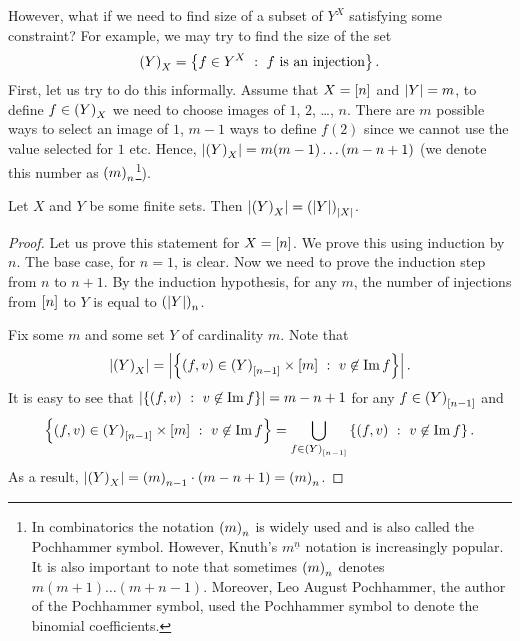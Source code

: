 However, what if we need to find size of a subset of $Y^X$ satisfying some
constraint? For example, we may try to find the size of the set
\[
  \injections{X}{Y} = \set[f\text{ is an injection}]{f \in \functions{X}{Y}}.
\]
First, let us try to do this informally. Assume that $X = \range{n}$ and
$\cardinality{Y} = m$,
to define $f \in \injections{X}{Y}$ we need to choose images of $1$, $2$, \dots,
$n$. There are $m$ possible ways to select an image of $1$, $m - 1$ ways to
define $f(2)$ since we cannot use the value selected for $1$ etc. Hence,
$\cardinality{\injections{X}{Y}} = m (m - 1) \dots (m - n + 1)$ (we denote this
number as $\numberOfPermutations[n]{m}$\footnote{%
  In combinatorics the notation $\numberOfPermutations[n]{m}$ is widely used and
  is also called the Pochhammer symbol. However, Knuth's $m^{\underline{n}}$
  notation is increasingly popular. It is also important to note that sometimes 
  $\numberOfPermutations[n]{m}$ denotes $m (m + 1) \dots (m + n - 1)$. Moreover,
  Leo August Pochhammer, the author of the Pochhammer symbol, used the
  Pochhammer symbol to denote the binomial coefficients.
}).

\begin{theorem}
\label{theorem:number-of-injections}
  Let $X$ and $Y$ be some finite sets. Then $\cardinality{\injections{X}{Y}} =
  \numberOfPermutations[\cardinality{X}]{\cardinality{Y}}$.
\end{theorem}
\begin{proof}
  Let us prove this statement for $X = \range{n}$. We prove this using induction by
  $n$. The base case, for $n = 1$, is clear. Now we need to prove the induction
  step from $n$ to $n + 1$. By the induction hypothesis, for any $m$, the
  number of injections from $\range{n}$ to $Y$ is equal to
  $\numberOfPermutations[n]{\cardinality{Y}}$.

  Fix some $m$ and some set $Y$ of cardinality $m$. Note that
  \[
    \cardinality{\injections{X}{Y}} =
    \cardinality{
      \set[v \not\in \Im f]{(f, v) \in \injections{\range{n - 1}}{Y} \times \range{m}}
    }.
  \]
  It is easy to see that $\cardinality{\set[v \not\in \Im f]{(f, v)}} = m - n + 1$
  for any $f \in \injections{\range{n - 1}}{Y}$ and
  \[
    \set[v \not\in \Im f]{(f, v) \in \injections{\range{n - 1}}{Y} \times
      \range{m}} =
    \bigcup_{f \in \injections{\range{n - 1}}{Y}} \set[v \not\in \Im f]{(f, v)}.
  \]
  As a result, $\cardinality{\injections{X}{Y}} = 
    \numberOfPermutations[n - 1]{m} \cdot (m - n + 1) =
    \numberOfPermutations[n]{m}$.
\end{proof}

